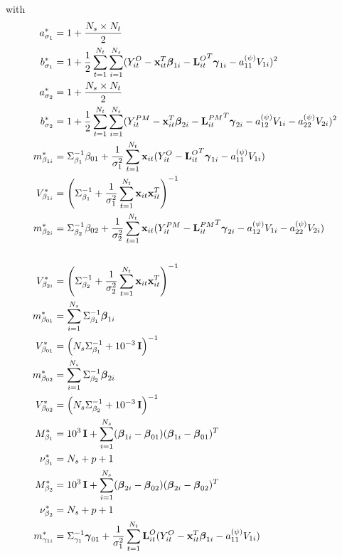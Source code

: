\documentclass[alpha-refs]{wiley-article}
\newcommand{\bbeta}{ \mbox{\boldmath $ \beta $} }
\newcommand{\bgamma}{ \mbox{\boldmath $\gamma$} }
\newcommand{\bI}{\textbf{I}}
\newcommand{\bL}{\textbf{L}}
\newcommand{\bx}{\textbf{x}}
\begin{document}
with
{\footnotesize
\begin{align*}
a^*_{\sigma_1} &= 1 + \frac{N_s \times N_t}{2}\\
b^*_{\sigma_1} &= 1 + \frac{1}{2} \sum_{t=1}^{N_t} \sum_{i=1}^{N_s} (Y^{O}_{it} - \bx_{it}^T \bbeta_{1i}-{\bL^{O}_{it}}^T\bgamma_{1i} - a_{11}^{(\psi)} V_{1i}  )^2 \\
a^*_{\sigma_2} &= 1 + \frac{N_s \times N_t}{2}\\
b^*_{\sigma_2} &= 1 + \frac{1}{2} \sum_{t=1}^{N_t} \sum_{i=1}^{N_s} (Y^{PM}_{it} - \bx_{it}^T \bbeta_{2i} -{\bL^{PM}_{it}}^T\bgamma_{2i} - a_{12}^{(\psi)} V_{1i}- a_{22}^{(\psi)} V_{2i}  )^2 \\
m_{\beta_{1i} }^* &= \Sigma_{\beta_1}^{-1} \beta_{01} + \frac{1}{\sigma^2_1} \sum^{N_t}_{t=1} \bx_{it} (Y^{O}_{it}- {\bL^{O}_{it}}^T\bgamma_{1i} - a_{11}^{(\psi)} V_{1i} )   \\
V_{\beta_{1i} }^* &= \left( \Sigma_{\beta_1}^{-1} + \frac{1}{\sigma_1^2} \sum^{N_t}_{t=1} \bx_{it} \bx_{it}^T  \right)^{-1} \\
m_{\beta_{2i} }^* &= \Sigma_{\beta_2}^{-1} \beta_{02} + \frac{1}{\sigma^2_2} \sum^{N_t}_{t=1} \bx_{it} (Y^{PM}_{it} - {\bL^{PM}_{it}}^T\bgamma_{2i} - a_{12}^{(\psi)} V_{1i}- a_{22}^{(\psi)} V_{2i}  )   \\ \\
V_{\beta_{2i} }^* &= \left( \Sigma_{\beta_2}^{-1} + \frac{1}{\sigma_2^2} \sum^{N_t}_{t=1} \bx_{it} \bx_{it}^T  \right)^{-1} \\
m_{\beta_{01} }^* &=  \sum_{i=1}^{N_s}  \Sigma_{\beta_1}^{-1} \bbeta_{1i} \\
V_{\beta_{01} }^* &= \left( N_s \Sigma_{\beta_1}^{-1}  + 10^{-3} \, \bI \right)^{-1} \\
m_{\beta_{02} }^* &=  \sum_{i=1}^{N_s}  \Sigma_{\beta_2}^{-1} \bbeta_{2i}  \\
V_{\beta_{02} }^* &= \left( N_s \Sigma_{\beta_2}^{-1}  + 10^{-3} \, \bI \right)^{-1}  \\
M_{\beta_1}^* &= 10^{3} \, \bI + \sum_{i=1}^{N_s} (\bbeta_{1i} - \bbeta_{01}) (\bbeta_{1i} - \bbeta_{01})^T \\
\nu_{\beta_1}^* &= N_s + p + 1 \\
M_{\beta_2}^* &=  10^{3} \, \bI + \sum_{i=1}^{N_s} (\bbeta_{2i} - \bbeta_{02}) (\bbeta_{2i} - \bbeta_{02})^T \\
\nu_{\beta_2}^* &= N_s + p + 1 \\
m_{\gamma_{1i} }^* &= \Sigma_{\gamma_1}^{-1} \bgamma_{01} + \frac{1}{\sigma^2_1} \sum^{N_t}_{t=1} {\bL^{O}_{it}} (Y^{O}_{it}- \bx_{it}^T\bbeta_{1i} - a_{11}^{(\psi)} V_{1i} )   \\

\end{align*}}
\end{document}
